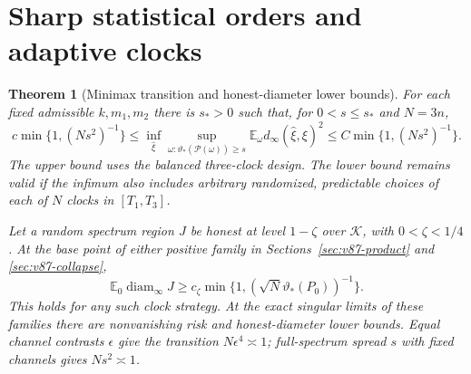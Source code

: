 \documentclass[11pt,reqno]{amsart}
\numberwithin{equation}{section}
\newtheorem{theorem}{Theorem}[section]
\theoremstyle{definition}\newtheorem{definition}[theorem]{Definition}
\theoremstyle{remark}\newtheorem{remark}[theorem]{Remark}
\newcommand{\E}{\mathbb E}
\newcommand{\diam}{\operatorname{diam}}
\newcommand{\cK}{\mathcal K}
\newcommand{\sig}{\vartheta}
\begin{document}
\section{Sharp statistical orders and adaptive clocks}
\label{sec:v87-lower}
\begin{theorem}[Minimax transition and honest-diameter lower bounds]
\label{thm:v87-minimax}
For each fixed admissible $k,m_1,m_2$ there is $s_*>0$ such that,
for $0<s\le s_*$ and $N=3n$,
\begin{equation}\label{eq:v87-minimax}
 c\min\{1,(Ns^2)^{-1}\}
 \le\inf_{\widehat\xi}\sup_{\omega:\sig_*(\mathcal P(\omega))\ge s}
       \E_\omega d_\infty(\widehat\xi,\xi)^2
 \le C\min\{1,(Ns^2)^{-1}\}.
\end{equation}
The upper bound uses the balanced three-clock design. The lower bound
remains valid if the infimum also includes arbitrary randomized,
predictable choices of each of $N$ clocks in $[T_1,T_3]$.

Let a random spectrum region $J$ be honest at level $1-\zeta$ over
$\cK$, with $0<\zeta<1/4$. At the base point of either positive
family in Sections~\ref{sec:v87-product} and
\ref{sec:v87-collapse},
\begin{equation}\label{eq:v87-diameter-lower}
 \E_0\diam_\infty J\ge c_\zeta
                      \min\{1,(\sqrt N\sig_*(P_0))^{-1}\}.
\end{equation}
This holds for any such clock strategy. At the exact singular limits
of these families there are nonvanishing risk and honest-diameter
lower bounds. Equal channel contrasts $\epsilon$ give the transition
$N\epsilon^4\asymp1$; full-spectrum spread $s$ with fixed channels
gives $Ns^2\asymp1$.
\end{theorem}
\end{document}
